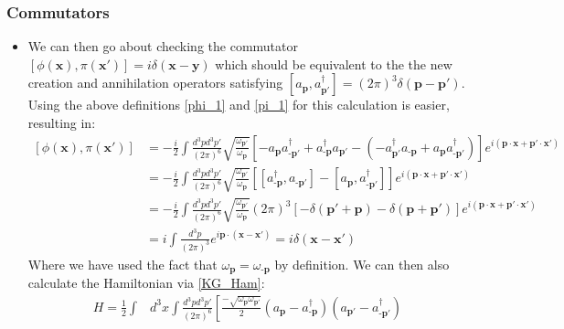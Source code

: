 \documentclass[11pt]{article}
\numberwithin{equation}{section}
\begin{document}
\subsubsection{Commutators}
\begin{itemize}
\item We can then go about checking the commutator $[\phi(\textbf{x}),\pi(\textbf{x}')]= i \delta(\textbf{x}-\textbf{y})$ which should be equivalent to the the new creation and annihilation operators satisfying $[a_{\textbf{p}},a^{\dagger}_{\textbf{p}'}] = (2 \pi)^{3}\delta(\textbf{p}-\textbf{p}')$. Using the above definitions \ref{phi_1} and \ref{pi_1} for this calculation is easier, resulting in:
\begin{equation}
\begin{split}
  [\phi(\textbf{x}),\pi(\textbf{x}')] & = -\frac{i}{2}\int \frac{d^3pd^3p'}{(2\pi)^6}\sqrt{\frac{\omega_{\textbf{p}'}}{\omega_{\textbf{p}}}}\left[-a_{\textbf{p}}a^{\dagger}_{\textbf{-p}'} + a^{\dagger}_{\textbf{-p}}a_{\textbf{p}'}-(-a^{\dagger}_{\textbf{p}'}a_{\textbf{-p}} + a_{\textbf{p}}a^{\dagger}_{\textbf{-p}'})\right]e^{i(\textbf{p}\cdot \textbf{x}+\textbf{p}'\cdot \textbf{x}')} \\ 
  &  = -\frac{i}{2}\int \frac{d^3pd^3p'}{(2\pi)^6}\sqrt{\frac{\omega_{\textbf{p}'}}{\omega_{\textbf{p}}}}\left[[a^{\dagger}_{\textbf{-p}},a_{\textbf{-p}'}]-[a_{\textbf{p}},a^{\dagger}_{\textbf{-p}'}]\right]e^{i(\textbf{p}\cdot \textbf{x}+\textbf{p}'\cdot \textbf{x}')}  \\ 
   & =  -\frac{i}{2}\int \frac{d^3pd^3p'}{(2\pi)^6}\sqrt{\frac{\omega_{\textbf{p}'}}{\omega_{\textbf{p}}}}(2\pi)^3\left[-\delta(\textbf{p}'+\textbf{p}) -\delta(\textbf{p}+\textbf{p}') \right]e^{i(\textbf{p}\cdot \textbf{x}+\textbf{p}'\cdot \textbf{x}')}  \\ 
   & = i\int \frac{d^3p}{(2\pi)^3}e^{i\textbf{p}\cdot( \textbf{x} -\textbf{x}')} = i\delta(\textbf{x} -\textbf{x}')  
  \end{split}
  \end{equation}  
  Where we have used the fact that $\omega_{\textbf{p}}=\omega_{\textbf{-p}}$ by definition. We can then also calculate the Hamiltonian via \ref{KG_Ham}:
  \begin{equation*}
    \begin{split}
      H  = \frac{1}{2}\int &d^3x\int\frac{d^3pd^3p'}{(2\pi)^6}\left[\frac{-\sqrt{\omega_{\textbf{p}}\omega_{\textbf{p}'}}}{2}\left(a_{\textbf{p}}-a^{\dagger}_{\textbf{-p}}\right)\left(a_{\textbf{p}'}-a^{\dagger}_{\textbf{-p}'}\right)\right. \\

\end{split}
\end{equation*}
\end{itemize}
\end{document}
